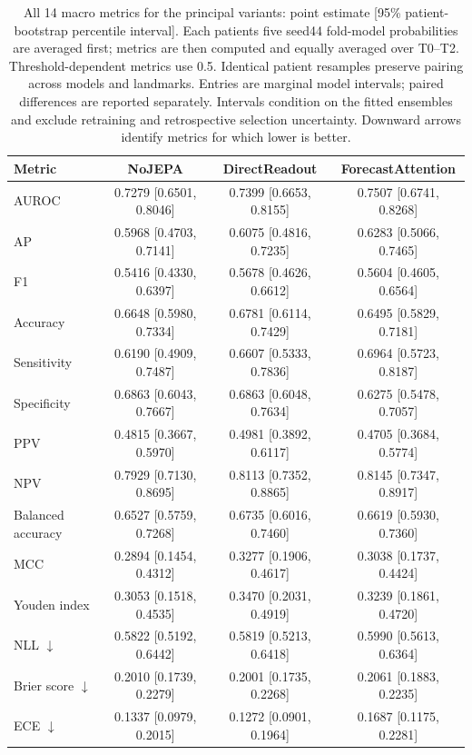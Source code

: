 \begin{table}[t]
\centering
\footnotesize
\setlength{\tabcolsep}{5pt}
\caption{All 14 macro metrics for the principal variants: point estimate [95\% patient-bootstrap percentile interval]. Each patient\textquotesingle s five seed44 fold-model probabilities are averaged first; metrics are then computed and equally averaged over T0--T2. Threshold-dependent metrics use 0.5. Identical patient resamples preserve pairing across models and landmarks. Entries are marginal model intervals; paired differences are reported separately. Intervals condition on the fitted ensembles and exclude retraining and retrospective selection uncertainty. Downward arrows identify metrics for which lower is better.}
\label{tab:extended_macro}
\begin{tabular}{lccc}
\toprule
Metric & NoJEPA & DirectReadout & ForecastAttention \\
\midrule
AUROC & 0.7279 [0.6501, 0.8046] & 0.7399 [0.6653, 0.8155] & 0.7507 [0.6741, 0.8268] \\
AP & 0.5968 [0.4703, 0.7141] & 0.6075 [0.4816, 0.7235] & 0.6283 [0.5066, 0.7465] \\
F1 & 0.5416 [0.4330, 0.6397] & 0.5678 [0.4626, 0.6612] & 0.5604 [0.4605, 0.6564] \\
Accuracy & 0.6648 [0.5980, 0.7334] & 0.6781 [0.6114, 0.7429] & 0.6495 [0.5829, 0.7181] \\
Sensitivity & 0.6190 [0.4909, 0.7487] & 0.6607 [0.5333, 0.7836] & 0.6964 [0.5723, 0.8187] \\
Specificity & 0.6863 [0.6043, 0.7667] & 0.6863 [0.6048, 0.7634] & 0.6275 [0.5478, 0.7057] \\
PPV & 0.4815 [0.3667, 0.5970] & 0.4981 [0.3892, 0.6117] & 0.4705 [0.3684, 0.5774] \\
NPV & 0.7929 [0.7130, 0.8695] & 0.8113 [0.7352, 0.8865] & 0.8145 [0.7347, 0.8917] \\
Balanced accuracy & 0.6527 [0.5759, 0.7268] & 0.6735 [0.6016, 0.7460] & 0.6619 [0.5930, 0.7360] \\
MCC & 0.2894 [0.1454, 0.4312] & 0.3277 [0.1906, 0.4617] & 0.3038 [0.1737, 0.4424] \\
Youden index & 0.3053 [0.1518, 0.4535] & 0.3470 [0.2031, 0.4919] & 0.3239 [0.1861, 0.4720] \\
NLL $\downarrow$ & 0.5822 [0.5192, 0.6442] & 0.5819 [0.5213, 0.6418] & 0.5990 [0.5613, 0.6364] \\
Brier score $\downarrow$ & 0.2010 [0.1739, 0.2279] & 0.2001 [0.1735, 0.2268] & 0.2061 [0.1883, 0.2235] \\
ECE $\downarrow$ & 0.1337 [0.0979, 0.2015] & 0.1272 [0.0901, 0.1964] & 0.1687 [0.1175, 0.2281] \\
\bottomrule
\end{tabular}
\end{table}
